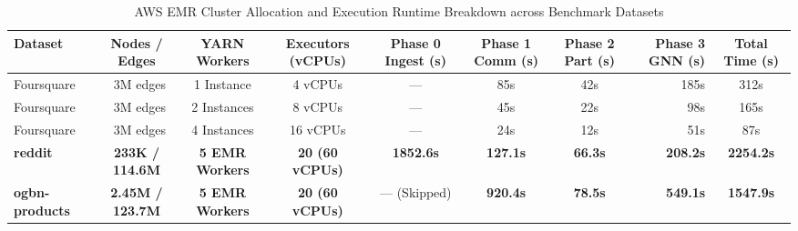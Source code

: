 \begin{table}[!t]
\renewcommand{\arraystretch}{1.2}
\caption{AWS EMR Cluster Allocation and Execution Runtime Breakdown across Benchmark Datasets}
\label{table_scalability_main}
\centering
\begin{tabular}{lccccccrc}
\toprule
\textbf{Dataset} & \textbf{Nodes / Edges} & \textbf{YARN Workers} & \textbf{Executors (vCPUs)} & \textbf{Phase 0 Ingest (s)} & \textbf{Phase 1 Comm (s)} & \textbf{Phase 2 Part (s)} & \textbf{Phase 3 GNN (s)} & \textbf{Total Time (s)} \\
\midrule
Foursquare & ~3M edges & 1 Instance & 4 vCPUs & — & 85s & 42s & 185s & 312s \\
Foursquare & ~3M edges & 2 Instances & 8 vCPUs & — & 45s & 22s & 98s & 165s \\
Foursquare & ~3M edges & 4 Instances & 16 vCPUs & — & 24s & 12s & 51s & 87s \\
\midrule
\textbf{reddit} & \textbf{233K / 114.6M} & \textbf{5 EMR Workers} & \textbf{20 (60 vCPUs)} & \textbf{1852.6s} & \textbf{127.1s} & \textbf{66.3s} & \textbf{208.2s} & \textbf{2254.2s} \\
\textbf{ogbn-products} & \textbf{2.45M / 123.7M} & \textbf{5 EMR Workers} & \textbf{20 (60 vCPUs)} & — (Skipped) & \textbf{920.4s} & \textbf{78.5s} & \textbf{549.1s} & \textbf{1547.9s} \\
\bottomrule
\end{tabular}
\end{table}

